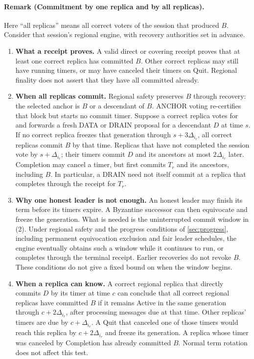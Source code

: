 \documentclass[11pt,a4paper]{article}
\begin{document}
\paragraph{Remark (Commitment by one replica and by all replicas).}
Here ``all replicas'' means all correct voters of the session that
produced $B$. Consider that session's regional engine, with recovery
authorities set in advance.
\begin{enumerate}[label=(\arabic*),itemsep=4pt]
\item \textbf{What a receipt proves.} A valid direct or covering
receipt proves that at least one correct replica has committed $B$.
Other correct replicas may still have running timers, or may have
canceled their timers on Quit. Regional finality does not assert that
they have all committed already.

\item \textbf{When all replicas commit.} Regional safety preserves
$B$ through recovery: the selected anchor is $B$ or a descendant of
$B$. ANCHOR voting re-certifies that block but starts no commit timer.
Suppose a correct replica votes for and forwards a fresh DATA or DRAIN
proposal for a descendant $D$ at time $s$. If no correct replica freezes
that generation through $s+3\Delta_{i_r}$, all correct replicas commit
$B$ by that time. Replicas that have not completed the session vote by
$s+\Delta_{i_r}$; their timers commit $D$ and its ancestors at most
$2\Delta_{i_r}$ later. Completion may cancel a timer, but first commits
$T_r$ and its ancestors, including $B$. In particular, a DRAIN need not
itself commit at a replica that completes through the receipt for $T_r$.

\item \textbf{Why one honest leader is not enough.} An honest leader
may finish its term before its timers expire. A Byzantine successor
can then equivocate and freeze the generation. What is needed is the
uninterrupted commit window in (2). Under regional safety and the
progress conditions of \cref{sec:progress}, including permanent
equivocation exclusion and fair leader schedules, the engine eventually
obtains such a window while it continues to run, or completes through
the terminal receipt. Earlier recoveries do not revoke $B$. These
conditions do not give a fixed bound on when the window begins.

\item \textbf{When a replica can know.} A correct regional replica
that directly commits $D$ by its timer at time $c$ can conclude that
all correct regional replicas have committed $B$ if it remains Active
in the same generation through $c+2\Delta_{i_r}$, after processing
messages due at that time. Other replicas' timers are due by
$c+\Delta_{i_r}$. A Quit that canceled one of those timers would reach
this replica by $c+2\Delta_{i_r}$ and freeze its generation. A replica
whose timer was canceled by Completion has already committed $B$.
Normal term rotation does not affect this test.


\end{enumerate}
\end{document}
